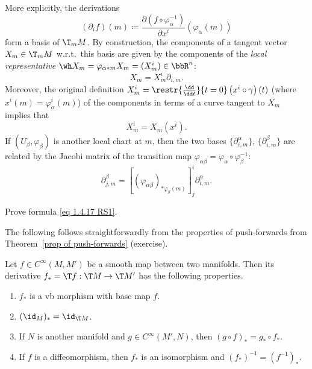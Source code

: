 \begin{rem}
    More explicitly, the derivations 
    \[(\partial_if)(m)\coloneqq \frac{\partial (f\circ\varphi_\alpha^{-1})}{\partial x^i}(\varphi_\alpha(m))\]
    form a basis of $\T_m M$. By construction, the components of a tangent vector $X_m\in \T_m M$ w.r.t.\ this basis are given by the components of the \emph{local representative} $\wh X_m=\varphi_{\alpha\ast m}X_m=(X_m^i)\in \bbR^n$:
    \[X_m=X_m^i \partial_{i,m}.\]
    Moreover, the original definition $X_m^i=\restr{\frac{\dd}{\dd t}}{t=0}\left(x^i\circ\gamma\right)(t)$ (where $x^i(m)=\varphi_\alpha^i(m)$) of the components in terms of a curve tangent to $X_m$ implies that 
    \[X_m^i=X_m(x^i).\]
    If $(U_\beta,\varphi_\beta)$ is another local chart at $m$, then the two bases $\{\partial_{i,m}^\alpha\}$, $\{\partial_{i,m}^\beta\}$ are related by the Jacobi matrix of the transition map $\varphi_{\alpha\beta}=\varphi_\alpha\circ\varphi_\beta^{-1}$:
    \[\partial_{j,m}^\beta=\left[\left(\varphi_{\alpha\beta}\right)_{\ast \varphi_\beta(m)}\right]^i_j \partial_{i,m}^\alpha.\label{eq 1.4.17 RS1}\]
\end{rem}

\begin{xca}
    Prove formula \eqref{eq 1.4.17 RS1}.
\end{xca}

The following follows straightforwardly from the properties of push-forwards from Theorem~\ref{prop of push-forwards} (exercise).

\begin{prop}[{\cite[Prop.~2.2.9]{RS1}}]\label{prop 2.2.9 RS1}
    Let $f\in C^\infty(M,M')$ be a smooth map between two manifolds. Then its derivative $f_\ast=\T f:\T M\to \T M'$ has the following properties.
    \begin{enumerate}
        \item $f_\ast$ is a \gls{vb} morphism with base map $f$.
        \item $(\id_M)_\ast=\id_{\T M}$.
        \item If $N$ is another manifold and $g\in C^\infty(M',N)$, then $(g\circ f)_\ast=g_\ast\circ f_\ast$.
        \item If $f$ is a diffeomorphism, then $f_\ast$ is an isomorphism and $(f_\ast)^{-1}=(f^{-1})_\ast$.
    \end{enumerate}
\end{prop}


